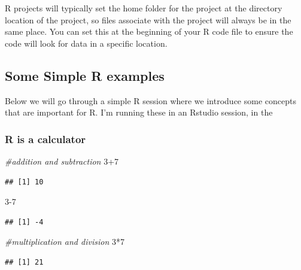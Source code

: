 \documentclass[
]{article}
\newenvironment{Shaded}{\begin{snugshade}}{\end{snugshade}}
\newcommand{\CommentTok}[1]{\textcolor[rgb]{0.56,0.35,0.01}{\textit{#1}}}
\newcommand{\DecValTok}[1]{\textcolor[rgb]{0.00,0.00,0.81}{#1}}
\newcommand{\SpecialCharTok}[1]{\textcolor[rgb]{0.00,0.00,0.00}{#1}}
\begin{document}
R projects will typically set the home folder for the project at the
directory location of the project, so files associate with the project
will always be in the same place. You can set this at the beginning of
your R code file to ensure the code will look for data in a specific
location.

\hypertarget{some-simple-r-examples}{%
\subsection{Some Simple R examples}\label{some-simple-r-examples}}

Below we will go through a simple R session where we introduce some
concepts that are important for R. I'm running these in an Rstudio
session, in the

\hypertarget{r-is-a-calculator}{%
\subsubsection{R is a calculator}\label{r-is-a-calculator}}

\begin{Shaded}
\begin{Highlighting}[]
\CommentTok{\#addition and subtraction}
\DecValTok{3}\SpecialCharTok{+}\DecValTok{7}
\end{Highlighting}
\end{Shaded}

\begin{verbatim}
## [1] 10
\end{verbatim}

\begin{Shaded}
\begin{Highlighting}[]
\DecValTok{3{-}7}
\end{Highlighting}
\end{Shaded}

\begin{verbatim}
## [1] -4
\end{verbatim}

\begin{Shaded}
\begin{Highlighting}[]
\CommentTok{\#multiplication and division}
\DecValTok{3}\SpecialCharTok{*}\DecValTok{7}
\end{Highlighting}
\end{Shaded}

\begin{verbatim}
## [1] 21
\end{verbatim}
\end{document}
